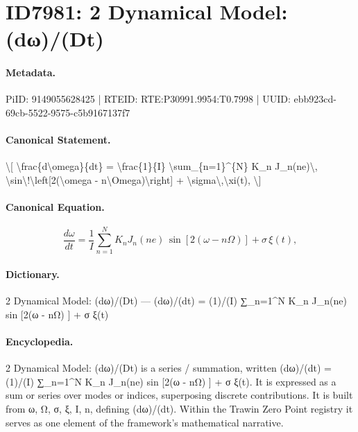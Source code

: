 \section*{ID7981: 2 Dynamical Model: (dω)/(Dt)}
\paragraph{Metadata.}
PiID: 9149055628425 | RTEID: RTE:P30991.9954:T0.7998 | UUID: ebb923cd-69cb-5522-9575-c5b9167137f7

\paragraph{Canonical Statement.}
\textbackslash{}[ \textbackslash{}frac\{d\textbackslash{}omega\}\{dt\} = \textbackslash{}frac\{1\}\{I\} \textbackslash{}sum\_\{n=1\}\textasciicircum{}\{N\} K\_n J\_n(ne)\textbackslash{}, \textbackslash{}sin\textbackslash{}!\textbackslash{}left[2(\textbackslash{}omega - n\textbackslash{}Omega)\textbackslash{}right] + \textbackslash{}sigma\textbackslash{},\textbackslash{}xi(t), \textbackslash{}]

\paragraph{Canonical Equation.}
\[
\frac{d\omega}{dt} = \frac{1}{I} \sum_{n=1}^{N} K_n J_n(ne)\, \sin\!\left[2(\omega - n\Omega)\right] + \sigma\,\xi(t),
\]

\paragraph{Dictionary.}
2 Dynamical Model: (dω)/(Dt) — (dω)/(dt) = (1)/(I) ∑\_n=1\textasciicircum{}N K\_n J\_n(ne) sin [2(ω - nΩ) ] + σ ξ(t)

\paragraph{Encyclopedia.}
2 Dynamical Model: (dω)/(Dt) is a series / summation, written (dω)/(dt) = (1)/(I) ∑\_n=1\textasciicircum{}N K\_n J\_n(ne) sin [2(ω - nΩ) ] + σ ξ(t). It is expressed as a sum or series over modes or indices, superposing discrete contributions. It is built from ω, Ω, σ, ξ, I, n, defining (dω)/(dt). Within the Trawin Zero Point registry it serves as one element of the framework's mathematical narrative.
